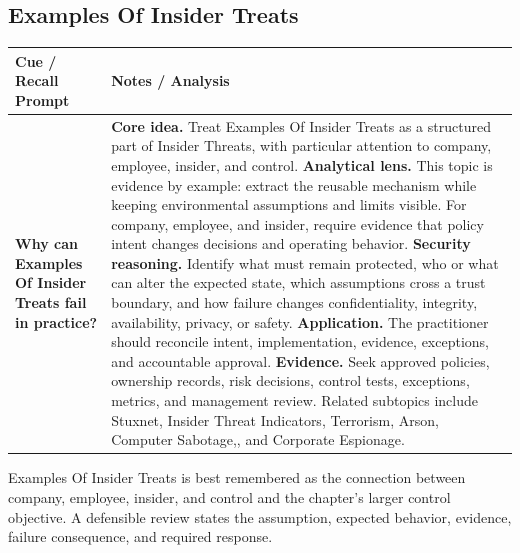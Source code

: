 \documentclass[11pt]{article}
\newcommand{\CornellHeader}{%
\rowcolor{Navy}\color{white}\bfseries Cue / Recall Prompt & \color{white}\bfseries Notes / Analysis\\\hline}
\newcommand{\CornellRow}[2]{%
\cellcolor{CueGray}\RaggedRight\textbf{#1} & \RaggedRight #2\\\hline}
\begin{document}
\subsection*{Examples Of Insider Treats}
\begin{longtable}{>{\RaggedRight\arraybackslash}p{}|>{\RaggedRight\arraybackslash}p{}}
\CornellHeader
\CornellRow{Why can Examples Of Insider Treats fail in practice?}{\textbf{Core idea.} Treat Examples Of Insider Treats as a structured part of Insider Threats, with particular attention to company, employee, insider, and control. \textbf{Analytical lens.} This topic is evidence by example: extract the reusable mechanism while keeping environmental assumptions and limits visible. For company, employee, and insider, require evidence that policy intent changes decisions and operating behavior. \textbf{Security reasoning.} Identify what must remain protected, who or what can alter the expected state, which assumptions cross a trust boundary, and how failure changes confidentiality, integrity, availability, privacy, or safety. \textbf{Application.} The practitioner should reconcile intent, implementation, evidence, exceptions, and accountable approval. \textbf{Evidence.} Seek approved policies, ownership records, risk decisions, control tests, exceptions, metrics, and management review. Related subtopics include Stuxnet, Insider Threat Indicators, Terrorism, Arson, Computer Sabotage,, and Corporate Espionage.}
\end{longtable}
\begin{topicsummary}
Examples Of Insider Treats is best remembered as the connection between company, employee, insider, and control and the chapter's larger control objective. A defensible review states the assumption, expected behavior, evidence, failure consequence, and required response.
\end{topicsummary}
\end{document}
